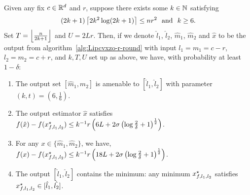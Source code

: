 \begin{proposition}
\label{proposition:zeroth-order-nonsmooth-one-round-one-dim}
Given any fix $c\in \mathbb{R}^d$ and $r$, suppose there exists some $k \in \mathbb{N}$ satisfying 
\begin{equation}
\label{eqn:existence-of-k-one-round-zo-one-dim-ns}
(2k + 1) \left\lceil{2k^2 \log (2k+1)}\right\rceil \leq nr^2~~\text{and}~~k \geq 6. 
\end{equation}
Set $T= \left\lfloor{\frac{n}{2k+1}}\right\rfloor$ and $U = 2Lr$. Then, if we denote $\hat{l}_1$, 
$\hat{l}_2$, $\hat{m}_1$, $\hat{m}_2$ and $\hat{x}$ to be the output from 
algorithm~\ref{alg:Lipcvxzo-r-round} with input $l_1 = m_1 = c-r$, 
$l_2 = m_2 = c+r$, and $k, T, U$ set up as above, we have, with probability at least $1-\delta$: 
\begin{enumerate}
\item The output set $[\hat{m}_1, \hat{m}_2]$ is amenable to  
	$[\hat{l}_1, \hat{l}_2]$ with parameter $(k, t) = \left(6, \frac{1}{6}\right)$.
\item The output estimator $\hat{x}$ satisfies $f(\hat{x}) - f(x_{f, l_1, l_2}^\star)
	\leq k^{-1} r\left(6L + 2\sigma \left(\log \frac{2}{\delta} + 1\right)^{\frac{1}{2}} \right)$. 
\item For any $x \in \{\hat{m}_1, \hat{m}_2\}$, we have, 
	$f(x) - f(x_{f, l_1, l_2}^\star) \leq k^{-1} r\left(18 L + 2\sigma \left(\log \frac{2}{\delta} + 1\right)^{\frac{1}{2}} \right)$. 
\item The output $[\hat{l}_1, \hat{l}_2]$ contains the minimum:
	 any minimum $x_{f, l_1, l_2}^\star$ satisfies $x_{f, l_1, l_2}^\star \in [\hat{l}_1, \hat{l_2}]$. 
\end{enumerate} 
\end{proposition}
